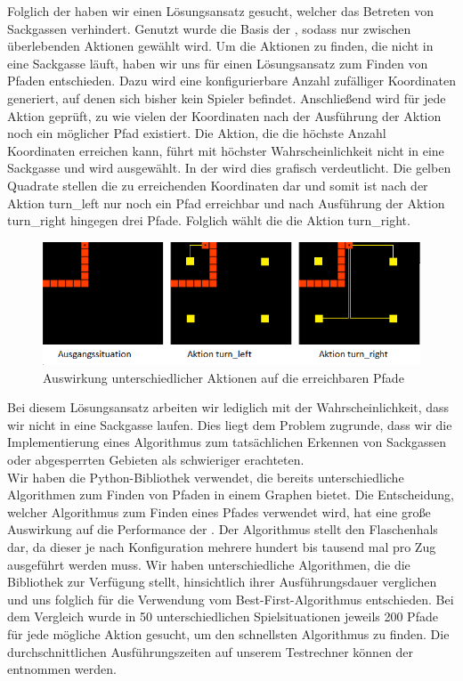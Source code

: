 Folglich der  haben wir einen Lösungsansatz gesucht, welcher das Betreten von Sackgassen
verhindert.
Genutzt wurde die Basis der , sodass nur zwischen überlebenden Aktionen gewählt wird.
Um die Aktionen zu finden, die nicht in eine Sackgasse läuft, haben wir uns für einen Lösungsansatz zum Finden von
Pfaden entschieden.
Dazu wird eine konfigurierbare Anzahl zufälliger Koordinaten generiert, auf denen sich bisher kein Spieler befindet.
Anschließend wird für jede Aktion geprüft, zu wie vielen der Koordinaten nach der Ausführung der Aktion noch ein
möglicher Pfad existiert.
Die Aktion, die die höchste Anzahl Koordinaten erreichen kann, führt mit höchster Wahrscheinlichkeit
nicht in eine Sackgasse und wird ausgewählt.
In der  wird dies grafisch verdeutlicht.
Die gelben Quadrate stellen die zu erreichenden Koordinaten dar und somit ist nach der Aktion turn\_left nur noch ein
Pfad erreichbar und nach Ausführung der Aktion turn\_right hingegen drei Pfade.
Folglich wählt die  die Aktion turn\_right.

\begin{figure}[htb]
    \centering
    \includegraphics{Bilder/pathfinding_example.png}
    \caption{Auswirkung unterschiedlicher Aktionen auf die erreichbaren Pfade}
    \label{fig:sackgasse-pfade}
\end{figure}

Bei diesem Lösungsansatz arbeiten wir lediglich mit der Wahrscheinlichkeit, dass wir nicht in eine Sackgasse laufen.
Dies liegt dem Problem zugrunde, dass wir die Implementierung eines Algorithmus zum tatsächlichen Erkennen von
Sackgassen oder abgesperrten Gebieten als schwieriger erachteten. \\

Wir haben die Python-Bibliothek  verwendet, die bereits unterschiedliche Algorithmen zum Finden von
Pfaden in einem Graphen bietet.
Die Entscheidung, welcher Algorithmus zum Finden eines Pfades verwendet wird, hat eine große Auswirkung auf die
Performance der .
Der Algorithmus stellt den Flaschenhals dar, da dieser je nach Konfiguration mehrere hundert bis tausend mal pro
Zug ausgeführt werden muss.
Wir haben unterschiedliche Algorithmen, die die Bibliothek zur Verfügung stellt, hinsichtlich ihrer Ausführungsdauer verglichen und uns folglich für die
Verwendung vom Best-First-Algorithmus entschieden.
Bei dem Vergleich wurde in 50 unterschiedlichen Spielsituationen jeweils 200 Pfade für jede mögliche Aktion gesucht, um
den schnellsten Algorithmus zu finden.
Die durchschnittlichen Ausführungszeiten auf unserem Testrechner können der
 entnommen werden.

